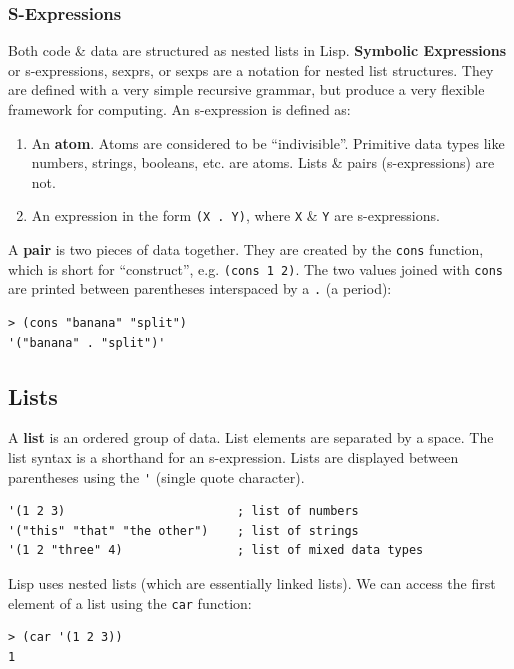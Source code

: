 \documentclass[a4paper,11pt]{article}
\begin{document}
\subsubsection{S-Expressions}
Both code \& data are structured as nested lists in Lisp. 
\textbf{Symbolic Expressions} or s-expressions, sexprs, or sexps are a notation for nested list structures.
They are defined with a very simple recursive grammar, but produce a very flexible framework for computing.
An s-expression is defined as: 
\begin{enumerate}
    \item   An \textbf{atom}. 
            Atoms are considered to be ``indivisible''. 
            Primitive data types like numbers, strings, booleans, etc. are atoms. 
            Lists \& pairs (s-expressions) are not.
    \item   An expression in the form \verb|(X . Y)|, where \verb|X| \& \verb|Y| are s-expressions.
\end{enumerate}

A \textbf{pair} is two pieces of data together.
They are created by the \verb|cons| function, which is short for ``construct'', e.g. \verb|(cons 1 2)|.
The two values joined with \verb|cons| are printed between parentheses interspaced by a \verb|.| (a period): 
\begin{verbatim}
> (cons "banana" "split")
'("banana" . "split")'
\end{verbatim}

\subsection{Lists}
A \textbf{list} is an ordered group of data.
List elements are separated by a space.
The list syntax is a shorthand for an s-expression.
Lists are displayed between parentheses using the \verb|'| (single quote character).
\begin{verbatim}
'(1 2 3)                        ; list of numbers
'("this" "that" "the other")    ; list of strings
'(1 2 "three" 4)                ; list of mixed data types
\end{verbatim}

Lisp uses nested lists (which are essentially linked lists). 
We can access the first element of a list using the \verb|car| function:
\begin{verbatim}
> (car '(1 2 3))
1
\end{verbatim}
\end{document}
